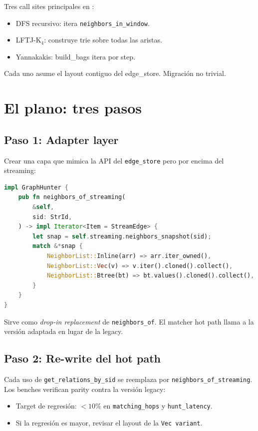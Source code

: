 Tres call sites principales en
:

\begin{itemize}
    \item DFS recursivo: itera \texttt{neighbors\_in\_window}.
    \item LFTJ-K\(_4\): construye trie sobre todas las aristas.
    \item Yannakakis: build\_bags itera por step.
\end{itemize}

\noindent
Cada uno asume el layout contiguo del edge\_store. Migración no
trivial.

\section{El plano: tres pasos}

\subsection{Paso 1: Adapter layer}

Crear una capa que mimica la API del \texttt{edge\_store} pero por
encima del streaming:

\begin{lstlisting}[language=Rust]
impl GraphHunter {
    pub fn neighbors_of_streaming(
        &self,
        sid: StrId,
    ) -> impl Iterator<Item = StreamEdge> {
        let snap = self.streaming.neighbors_snapshot(sid);
        match &*snap {
            NeighborList::Inline(arr) => arr.iter_owned(),
            NeighborList::Vec(v) => v.iter().cloned().collect(),
            NeighborList::Btree(bt) => bt.values().cloned().collect(),
        }
    }
}
\end{lstlisting}

\noindent
Sirve como \emph{drop-in replacement} de
\texttt{neighbors\_of}. El matcher hot path llama a la versión
adaptada en lugar de la legacy.

\subsection{Paso 2: Re-write del hot path}

Cada uso de \texttt{get\_relations\_by\_sid} se reemplaza por
\texttt{neighbors\_of\_streaming}. Los benches verifican parity
contra la versión legacy:

\begin{itemize}
    \item Target de regresión: \(< 10\%\) en
    \texttt{matching\_hops} y \texttt{hunt\_latency}.
    \item Si la regresión es mayor, revisar el layout de la
    \texttt{Vec variant}.
\end{itemize}

